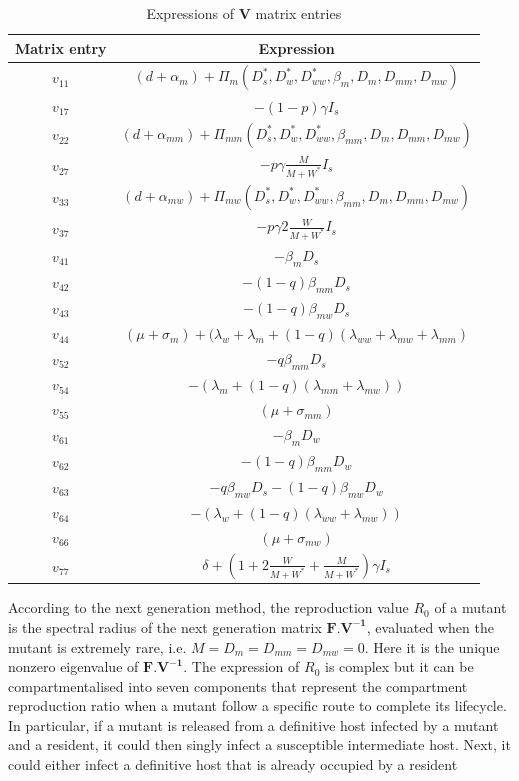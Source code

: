 \documentclass{article}
\begin{document}
\begin{table}[!ht]
\begin{tabular}{|c|c|}
\hline
Matrix entry & Expression \\
\hline
$v_{11}$ & $(d + \alpha_m) + \Pi_m(D_s^*, D_w^*, D_{ww}^*, \beta_m, D_m, D_{mm}, D_{mw}) $ \\
\hline
$v_{17}$ & $-(1 - p) \gamma I_s$ \\
\hline
$v_{22}$ &  $(d + \alpha_{mm}) + \Pi_{mm}(D_s^*, D_w^*, D_{ww}^*, \beta_{mm}, D_m, D_{mm}, D_{mw})$ \\
\hline
$v_{27}$ & $-p \gamma \frac{M}{M + W^*}  I_s$ \\
\hline
$v_{33}$ & $ (d + \alpha_{mw}) + \Pi_{mw}(D_s^*, D_w^*, D_{ww}^*, \beta_{mm}, D_m, D_{mm}, D_{mw})$ \\
\hline
$v_{37}$ & $- p \gamma 2 \frac{W}{M + W^*} I_s$ \\
\hline
$v_{41}$ & $-\beta_m D_s$ \\
\hline
$v_{42}$ & $-(1 - q) \beta_{mm} D_s$ \\
\hline
$v_{43}$ & $-(1 - q) \beta_{mw} D_s$ \\
\hline
$v_{44}$ & $(\mu + \sigma_m) + (\lambda_w + \lambda_m + (1 - q) (\lambda_{ww} + \lambda_{mw} + \lambda_{mm}) $ \\
\hline
$v_{52}$ & $- q \beta_{mm} D_s$ \\
\hline
$v_{54}$ & $-(\lambda_m + (1 - q) (\lambda_{mm} + \lambda_{mw}))$ \\
\hline
$v_{55}$ & $(\mu + \sigma_{mm})$ \\
\hline
$v_{61}$ & $-\beta_m D_w$ \\
\hline
$v_{62}$ & $ -(1 - q) \beta_{mm} D_w$ \\
\hline
$v_{63}$ & $- q \beta_{mw} D_s - (1 - q) \beta_{mw} D_w$ \\
\hline
$v_{64}$ &  $-(\lambda_w + (1 - q) (\lambda_{ww} +\lambda_{mw}))$ \\
\hline
$v_{66}$ & $(\mu + \sigma_{mw})$ \\
\hline
$v_{77}$ & $\delta + (1 + 2 \frac{W}{M + W^*} + \frac{M}{M + W^*}) \gamma I_s$ \\
\hline
\end{tabular}
\caption{Expressions of $\mathbf{V}$ matrix entries}
\label{table:Ventries}
\end{table}

According to the next generation method, the reproduction value $R_0$ of a mutant is the spectral radius of the next generation matrix $\mathbf{F.V^{-1}}$, evaluated when the mutant is extremely rare, i.e. $M = D_{m} = D_{mm} = D_{mw} = 0$. Here it is the unique nonzero eigenvalue of $\mathbf{F.V^{-1}}$. The expression of $R_0$ is complex but it can be compartmentalised into seven components that represent the compartment reproduction ratio when a mutant follow a specific route to complete its lifecycle. In particular, if a mutant is released from a definitive host infected by a mutant and a resident, it could then singly infect a susceptible intermediate host. Next, it could either infect a definitive host that is already occupied by a resident
\end{document}

